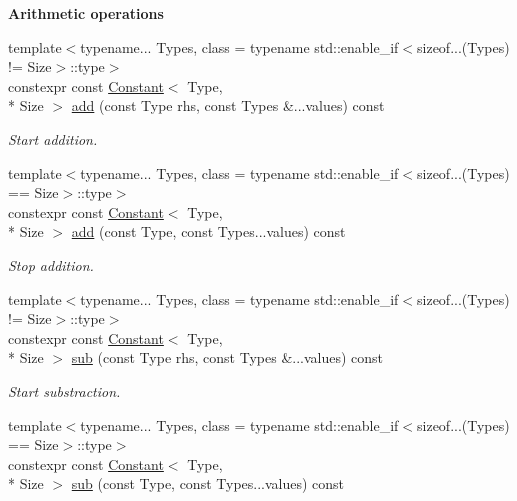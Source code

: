 \begin{Indent}{\bf Arithmetic operations}\par
\begin{DoxyCompactItemize}
\item 
{\footnotesize template$<$typename... Types, class  = typename std\-::enable\-\_\-if$<$sizeof...(\-Types) != Size$>$\-::type$>$ }\\constexpr const \hyperlink{exceptionmagrathea_1_1Constant}{Constant}$<$ Type, \\*
Size $>$ \hyperlink{exceptionmagrathea_1_1Constant_a4f3ccbe74306530d30fc5ec67d16c092}{add} (const Type rhs, const Types \&...values) const 
\begin{DoxyCompactList}\small\item\em Start addition. \end{DoxyCompactList}\item 
{\footnotesize template$<$typename... Types, class  = typename std\-::enable\-\_\-if$<$sizeof...(\-Types) == Size$>$\-::type$>$ }\\constexpr const \hyperlink{exceptionmagrathea_1_1Constant}{Constant}$<$ Type, \\*
Size $>$ \hyperlink{exceptionmagrathea_1_1Constant_abf612d53d00649319498d15cd70c768b}{add} (const Type, const Types...\-values) const 
\begin{DoxyCompactList}\small\item\em Stop addition. \end{DoxyCompactList}\item 
{\footnotesize template$<$typename... Types, class  = typename std\-::enable\-\_\-if$<$sizeof...(\-Types) != Size$>$\-::type$>$ }\\constexpr const \hyperlink{exceptionmagrathea_1_1Constant}{Constant}$<$ Type, \\*
Size $>$ \hyperlink{exceptionmagrathea_1_1Constant_af80b793e954db82f9ef25957aca41583}{sub} (const Type rhs, const Types \&...values) const 
\begin{DoxyCompactList}\small\item\em Start substraction. \end{DoxyCompactList}\item 
{\footnotesize template$<$typename... Types, class  = typename std\-::enable\-\_\-if$<$sizeof...(\-Types) == Size$>$\-::type$>$ }\\constexpr const \hyperlink{exceptionmagrathea_1_1Constant}{Constant}$<$ Type, \\*
Size $>$ \hyperlink{exceptionmagrathea_1_1Constant_a7b30d612d39ab4387d471f1245536c5c}{sub} (const Type, const Types...\-values) const 

\end{DoxyCompactItemize}
\end{Indent}
